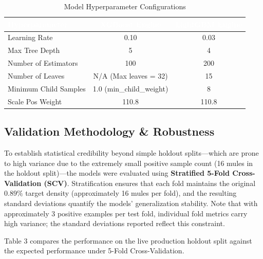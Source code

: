 \documentclass[11pt,a4paper]{article}
\begin{document}
\begin{table}[htbp]
\caption{Model Hyperparameter Configurations}
\label{table:hyperparams}
\centering
\small
\begin{tabularx}{\textwidth}{Xcc}
\hline
\rowcolor{navy} \textcolor{white}{\textbf{Hyperparameter}} & \textcolor{white}{\textbf{XGBoost Engine}} & \textcolor{white}{\textbf{LightGBM Engine}} \\
\hline
Learning Rate & 0.10 & 0.03 \\
\hline
\rowcolor{tablerowgray}
Max Tree Depth & 5 & 4 \\
\hline
Number of Estimators & 100 & 200 \\
\hline
\rowcolor{tablerowgray}
Number of Leaves & N/A (Max leaves = 32) & 15 \\
\hline
Minimum Child Samples & 1.0 (min\_child\_weight) & 8 \\
\hline
\rowcolor{tablerowgray}
Scale Pos Weight & 110.8 & 110.8 \\
\hline
\end{tabularx}
\end{table}

\subsection{Validation Methodology \& Robustness}
To establish statistical credibility beyond simple holdout splits—which are prone to high variance due to the extremely small positive sample count (16 mules in the holdout split)—the models were evaluated using \textbf{Stratified 5-Fold Cross-Validation (SCV)}. Stratification ensures that each fold maintains the original $0.89\%$ target density (approximately 16 mules per fold), and the resulting standard deviations quantify the models' generalization stability. Note that with approximately 3 positive examples per test fold, individual fold metrics carry high variance; the standard deviations reported reflect this constraint.

Table 3 compares the performance on the live production holdout split against the expected performance under 5-Fold Cross-Validation.
\end{document}
